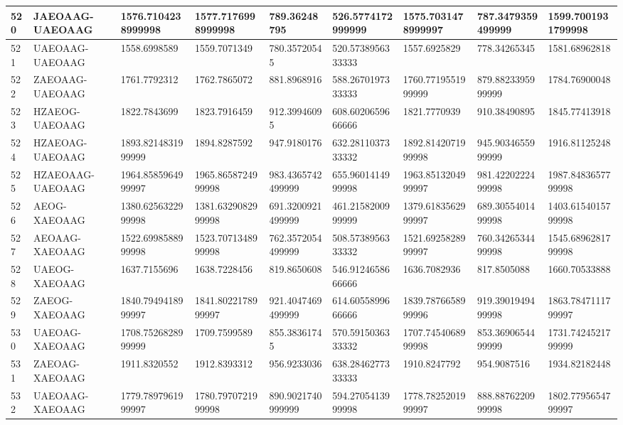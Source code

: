 {\begin{longtable}{|l|l|l|l|l|l|l|l|l|}
        520 & JAEOAAG-UAEOAAG & 1576.7104238999998 & 1577.7176998999998 & 789.36248795 & 526.5774172999999 & 1575.7031478999997 & 787.3479359499999 & 1599.7001931799998 \\ \hline
        521 & UAEOAAG-UAEOAAG & 1558.6998589 & 1559.7071349 & 780.35720545 & 520.5738956333333 & 1557.6925829 & 778.34265345 & 1581.68962818 \\ \hline
        522 & ZAEOAAG-UAEOAAG & 1761.7792312 & 1762.7865072 & 881.8968916 & 588.2670197333333 & 1760.7719551999999 & 879.8823395999999 & 1784.76900048 \\ \hline
        523 & HZAEOG-UAEOAAG & 1822.7843699 & 1823.7916459 & 912.39946095 & 608.6020659666666 & 1821.7770939 & 910.38490895 & 1845.77413918 \\ \hline
        524 & HZAEOAG-UAEOAAG & 1893.8214831999999 & 1894.8287592 & 947.9180176 & 632.2811037333332 & 1892.8142071999998 & 945.9034655999999 & 1916.81125248 \\ \hline
        525 & HZAEOAAG-UAEOAAG & 1964.8585964999997 & 1965.8658724999998 & 983.4365742499999 & 655.9601414999998 & 1963.8513204999997 & 981.4220222499998 & 1987.8483657799998 \\ \hline
        526 & AEOG-XAEOAAG & 1380.6256322999998 & 1381.6329082999998 & 691.3200921499999 & 461.2158200999999 & 1379.6183562999997 & 689.3055401499998 & 1403.6154015799998 \\ \hline
        527 & AEOAAG-XAEOAAG & 1522.6998588999998 & 1523.7071348999998 & 762.3572054499999 & 508.5738956333332 & 1521.6925828999997 & 760.3426534499998 & 1545.6896281799998 \\ \hline
        528 & UAEOG-XAEOAAG & 1637.7155696 & 1638.7228456 & 819.8650608 & 546.9124658666666 & 1636.7082936 & 817.8505088 & 1660.70533888 \\ \hline
        529 & ZAEOG-XAEOAAG & 1840.7949418999997 & 1841.8022178999997 & 921.4047469499999 & 614.6055899666666 & 1839.7876658999996 & 919.3901949499998 & 1863.7847111799997 \\ \hline
        530 & UAEOAG-XAEOAAG & 1708.7526828999999 & 1709.7599589 & 855.38361745 & 570.5915036333332 & 1707.7454068999998 & 853.3690654499999 & 1731.7424521799999 \\ \hline
        531 & ZAEOAG-XAEOAAG & 1911.8320552 & 1912.8393312 & 956.9233036 & 638.2846277333333 & 1910.8247792 & 954.9087516 & 1934.82182448 \\ \hline
        532 & UAEOAAG-XAEOAAG & 1779.7897961999997 & 1780.7970721999998 & 890.9021740999999 & 594.2705413999998 & 1778.7825201999997 & 888.8876220999998 & 1802.7795654799997 \\ \hline

\end{longtable}}
